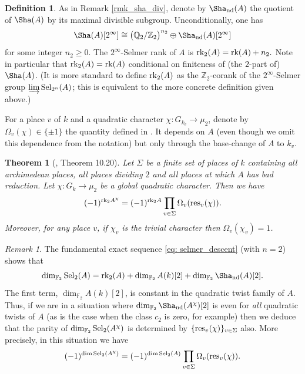 \documentclass[10pt]{amsart}
\numberwithin{equation}{section}
\newtheorem{theorem}[equation]{Theorem}
\theoremstyle{remark}
\newtheorem{remark}[equation]{Remark}
\theoremstyle{definition}
\theoremstyle{definition}
\theoremstyle{definition}
\newtheorem{defi}[equation]{Definition}
\theoremstyle{definition}
\theoremstyle{definition}
\theoremstyle{definition}
\theoremstyle{definition}
\theoremstyle{definition}
\begin{document}
\begin{defi}
As in Remark \ref{rmk_sha_div}, denote by $\Sha_{\textup{nd}}(A)$ the quotient of $\Sha(A)$ by its maximal divisible subgroup. Unconditionally, one has 
\[\Sha(A)[2^\infty]\cong \big(\mathbb{Q}_2/\mathbb{Z}_2\big)^{n_2}\oplus \Sha_{\textup{nd}}(A)[2^\infty]\]
for some integer $n_2\geq 0$.
The $2^\infty$-Selmer rank of $A$ is 
$\textup{rk}_2(A)=\textup{rk}(A)+n_2.$
Note in particular that $\textup{rk}_2(A)=\textup{rk}(A)$ conditional on finiteness of (the $2$-part of) $\Sha(A)$. 
(It is more standard to define $\textup{rk}_2(A)$ as the $\mathbb{Z}_2$-corank of the $2^\infty$-Selmer group $\varinjlim\textup{Sel}_{2^n}(A)$; this is equivalent to the more concrete definition given above.)
\end{defi} 

For a place $v$ of $k$ and a quadratic character $\chi:G_{k_v}\to \mu_2$,  denote by $\Omega_v(\chi)\in \{\pm 1\}$ the quantity defined in \cite[Defintion 10.21]{MR3951582}. It depends on $A$ (even though we omit this dependence from the notation)  but only through the base-change of $A$ to $k_v$.

\begin{theorem}[\cite{MR3951582}, Theorem 10.20] \label{Thm:parity}
Let $\Sigma$ be a finite set of places of $k$ containing all archimedean places, all places dividing $2$ and all places at which $A$ has bad reduction. Let $\chi:G_k\to \mu_2$ be a global quadratic character. Then we have 
\[(-1)^{\textup{rk}_2A^\chi}=(-1)^{\textup{rk}_2A}\prod_{v\in \Sigma}\Omega_v(\textup{res}_v(\chi)).\] 
Moreover, for any place $v$,  if $\chi_v$ is the trivial character then $\Omega_v(\chi_v)=1$.
\end{theorem}
 

\begin{remark} \label{rem:Selmer_parity}
The fundamental exact sequence \eqref{eq: selmer_descent} (with $n=2$) shows that 
\begin{equation} \label{dimension_of_selmer_etc}
\dim_{\mathbb{F}_2}\textup{Sel}_2(A) = \textup{rk}_2(A)+\dim_{\mathbb{F}_2} A(k)[2]+\dim_{\mathbb{F}_2}\Sha_{\textup{nd}}(A)[2].
\end{equation}
 The first term, $\dim_{\mathbb{F}_2}A(k)[2]$, is constant in the quadratic twist family of $A$. 
Thus,  if we are in a situation where  $\dim_{\mathbb{F}_2}\Sha_{\textup{nd}}(A^\chi)[2]$ is even for \textit{all} quadratic twists of $A$ (as is the case when the class $c_2$ is zero, for example) then we deduce that the parity of $\dim_{\mathbb{F}_2}\textup{Sel}_2(A^\chi)$ is determined by $\{\textup{res}_v(\chi)\}_{v\in \Sigma}$ also. More precisely, in this situation we have 
\[(-1)^{\dim \textup{Sel}_2(A^\chi)}=(-1)^{\dim \textup{Sel}_2(A)}\prod_{v\in \Sigma}\Omega_v(\textup{res}_v(\chi)).\]
\end{remark}
\end{document}
